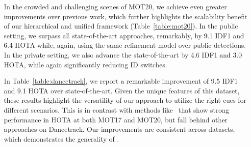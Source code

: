 \documentclass[10pt,twocolumn,letterpaper]{article}
\begin{document}
{{\begin{table}[h]
\label{table:mot20}
\end{table}
 
 In the crowded and challenging scenes of MOT20, we achieve even greater improvements over previous work, which further highlights the scalability benefit of our hierarchical and unified framework (Table~\ref{table:mot20}). In the public setting, we surpass all state-of-the-art approaches, remarkably, by 9.1 IDF1 and 6.4 HOTA while, again, using the same refinement model over public detections. In the private setting, we also advance the state-of-the-art  by 4.6 IDF1 and 3.0 HOTA, while again significantly reducing ID switches. 

\begin{table}[h]
\center
\tabcolsep=0.11cm


\caption{Test set results on DanceTrack benchmark.}

\label{table:dancetrack}
\end{table}
  In Table~\ref{table:dancetrack}, we report a remarkable improvement of 9.5 IDF1 and 9.1 HOTA over state-of-the-art. Given the unique features of this dataset, these results highlight the versatility of our approach to utilize the right cues for different scenarios. 
This is in contrast with methods like~\cite{bytetrack} that show strong performance in HOTA at both MOT17 and MOT20, but fall behind other approaches on Dancetrack. 
Our improvements are consistent across datasets, which demonstrates the generality of \modelname.


}}
\end{document}
